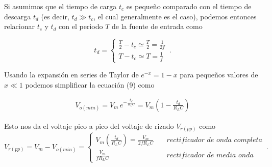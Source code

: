 \documentclass{article}
\begin{document}
\noindent Si asumimos que el tiempo de carga $t_c$ es pequeño comparado con el tiempo de descarga  $t_d$ (es decir, $t_d \gg t_c$, el cual generalmente es el caso), podemos entonces relacionar $t_c$ y $t_d$ con el periodo $T$ de la fuente de entrada como

\begin{equation}
	t_d =  
	\begin{cases}
		\frac{T}{2} - t_c \simeq \frac{T}{2} = \frac{1}{2f}\\
		T - t_c  \simeq T = \frac{1}{f}
	\end{cases}\,.
\end{equation}

\noindent Usando la expansión en series de Taylor de $e^{-x} = 1-x$ para pequeños valores de $x \ll 1$ podemos simplificar la ecuación (9) como

\begin{align}
	V_{o(min)} = V_m \, e^{- \frac{t_d}{R_L C}} = V_m \left( 1 - \frac{t_d}{R_L C} \right)
\end{align}

\noindent Esto nos da el voltaje pico a pico del voltaje de rizado $V_{r(pp)}$ como
\begin{equation}
	V_{r(pp)} = V_m  - V_{o(min)} =   
	\begin{cases}
		V_m \left( \frac{t_d}{R_L C} \right)= \frac{V_m}{2fR_L C} \quad & rectificador \,\, de \,\, onda \,\, completa\\
		\frac{V_m}{fR_L C} \quad & rectificador \,\, de \,\, media \,\, onda
	\end{cases}\,.
\end{equation}
\end{document}
